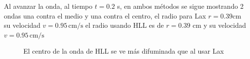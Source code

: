 \documentclass[12pt,a4paper]{book}
\begin{document}
Al avanzar la onda, al tiempo $t = 0.2$ s, en ambos métodos se sigue mostrando 2 ondas una contra el medio y una contra el centro, el radio para Lax $r = 0.39$cm su velocidad $v = 0.95 \, \mathrm{cm}/\mathrm{s}$ el radio usando HLL es de $r = 0.39$ cm y su velocidad $v = 0.95 \, \mathrm{cm}/\mathrm{s}$
\begin{figure}[H]
\centering
{}
\caption{El centro de la onda de HLL se ve más difuminada que al usar Lax} \label{fig:Lax-hll-relativista}
\end{figure}
\end{document}
